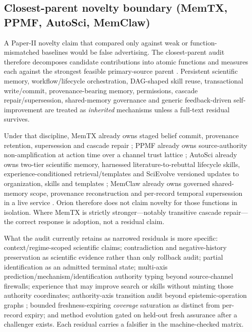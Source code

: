 \subsection{Closest-parent novelty boundary (MemTX, PPMF, AutoSci, MemClaw)}

A Paper-II novelty claim that compared only against weak or function-mismatched baselines would be false advertising. The closest-parent audit therefore decomposes candidate contributions into atomic functions and measures each against the strongest feasible primary-source parent \cite{memtx2026,ppmf2026,autosci2026,memclaw2026,riosgarcia2026}. Persistent scientific memory, workflow/lifecycle orchestration, DAG-shaped skill reuse, transactional write/commit, provenance-bearing memory, permissions, cascade repair/supersession, shared-memory governance and generic feedback-driven self-improvement are treated as \emph{inherited} mechanisms unless a full-text residual survives.

Under that discipline, MemTX already owns staged belief commit, provenance retention, supersession and cascade repair \cite{memtx2026}; PPMF already owns source-authority non-amplification at action time over a channel trust lattice \cite{ppmf2026}; AutoSci already owns two-tier scientific memory, harnessed literature-to-rebuttal lifecycle skills, experience-conditioned retrieval/templates and SciEvolve versioned updates to organization, skills and templates \cite{autosci2026}; MemClaw already owns governed shared-memory scope, provenance reconstruction and per-record temporal supersession in a live service \cite{memclaw2026}. Orion therefore does not claim novelty for those functions in isolation. Where MemTX is strictly stronger---notably transitive cascade repair---the correct response is adoption, not a residual claim.

What the audit currently retains as narrowed residuals is more specific: context/regime-scoped scientific claims; contradiction and negative-history preservation as scientific evidence rather than only rollback audit; partial identification as an admitted terminal state; multi-axis prediction/mechanism/identification authority typing beyond source-channel firewalls; experience that may improve search or skills without minting those authority coordinates; authority-axis transition audit beyond epistemic-operation graphs \cite{riosgarcia2026}; bounded freshness-expiring \emph{coverage} saturation as distinct from per-record expiry; and method evolution gated on held-out fresh assurance after a challenger exists. Each residual carries a falsifier in the machine-checked matrix.

